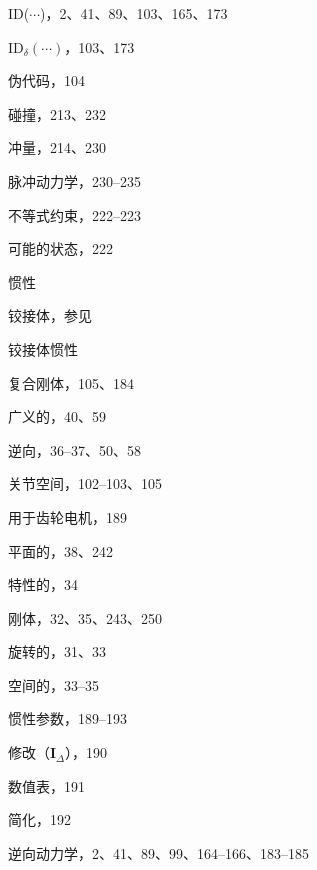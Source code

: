 \documentclass[10pt,a4paper]{book}
\theoremstyle{thmstyle} %
\theoremstyle{defstyle} %
\theoremstyle{prostyle} %
\begin{document}
ID($\cdots$)，2、41、89、103、165、173



$\mathrm{ID}_{\delta}(\cdots)$，103、173



伪代码，104



碰撞，213、232



冲量，214、230



脉冲动力学，230–235



不等式约束，222–223



可能的状态，222



惯性



铰接体，参见



铰接体惯性



复合刚体，105、184



广义的，40、59



逆向，36–37、50、58



关节空间，102–103、105



用于齿轮电机，189



平面的，38、242



特性的，34



刚体，32、35、243、250



旋转的，31、33



空间的，33–35



惯性参数，189–193



修改（$\boldsymbol{I}_{\Delta}$），190



数值表，191



简化，192



逆向动力学，2、41、89、99、164–166、183–185
\end{document}
